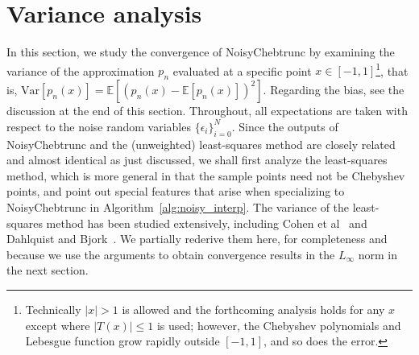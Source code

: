 \documentclass[final,onefignum,onetabnum]{siamart220329}
\def\mainalg{NoisyChebtrunc}
\begin{document}
\section{Variance analysis}\label{sec:var}
In this section, we study the convergence of {\mainalg} by examining the variance of the approximation $p_n$ evaluated at a specific point {$x\in[-1,1]$}\footnote{Technically $|x|>1$ is allowed and the forthcoming analysis holds for any $x$ {except where 
		$|T(x)|\leq 1$ is used}; however, the Chebyshev polynomials and Lebesgue {function} grow rapidly outside $[-1,1]$, and so does the error.}, that is, $\mbox{Var}[p_n(x)] = \mathbb{E}[(p_n(x)-\mathbb{E}[p_n(x)])^2]$.
Regarding the bias, see the discussion at the end of this section.
Throughout, all expectations are taken with respect to the noise random variables $\{\epsilon_i\}_{i=0}^N$. 
Since the outputs of {\mainalg} and the (unweighted) least-squares method  are closely related and almost identical as just discussed, we shall first analyze the least-squares method, which is more general in that the sample points need not be Chebyshev points, and point out special features that arise when specializing to {\mainalg} in Algorithm~\ref{alg:noisy_interp}. 
The variance of the least-squares method has been studied extensively, including Cohen et al~\cite{cohen2013stability} and Dahlquist and Bjork~\cite[\S~4.5.6]{dahlquist2008numerical}. 
We partially rederive them here, for completeness and because we use the arguments to obtain convergence results in the $L_\infty$ norm in the next section. 
\end{document}
